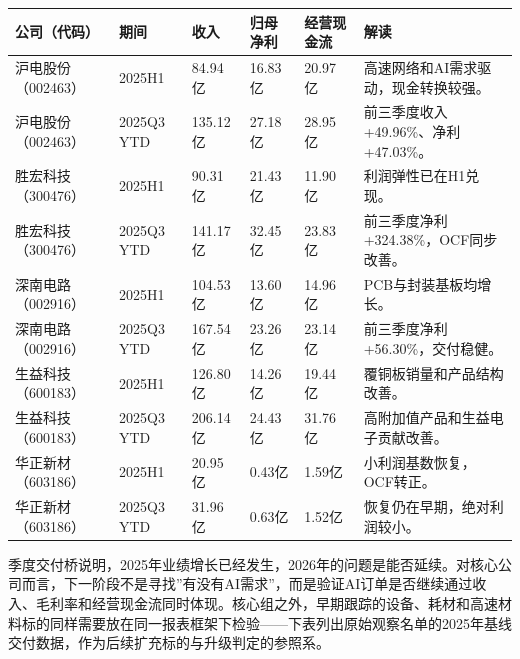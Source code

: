 \begin{exhibitbox}[图表6-4：官方季度交付桥]
\footnotesize
\begin{tabularx}{\textwidth}{L{1.8cm}L{1.8cm}R{1.7cm}R{1.7cm}R{1.7cm}X}
\toprule
\textbf{公司（代码）} & \textbf{期间} & \textbf{收入} & \textbf{归母净利} & \textbf{经营现金流} & \textbf{解读} \\
\midrule
沪电股份（002463） & 2025H1 & 84.94亿 & 16.83亿 & 20.97亿 & 高速网络和AI需求驱动，现金转换较强。 \\
沪电股份（002463） & 2025Q3 YTD & 135.12亿 & 27.18亿 & 28.95亿 & 前三季度收入+49.96\%、净利+47.03\%。 \\
胜宏科技（300476） & 2025H1 & 90.31亿 & 21.43亿 & 11.90亿 & 利润弹性已在H1兑现。 \\
胜宏科技（300476） & 2025Q3 YTD & 141.17亿 & 32.45亿 & 23.83亿 & 前三季度净利+324.38\%，OCF同步改善。 \\
深南电路（002916） & 2025H1 & 104.53亿 & 13.60亿 & 14.96亿 & PCB与封装基板均增长。 \\
深南电路（002916） & 2025Q3 YTD & 167.54亿 & 23.26亿 & 23.14亿 & 前三季度净利+56.30\%，交付稳健。 \\
生益科技（600183） & 2025H1 & 126.80亿 & 14.26亿 & 19.44亿 & 覆铜板销量和产品结构改善。 \\
生益科技（600183） & 2025Q3 YTD & 206.14亿 & 24.43亿 & 31.76亿 & 高附加值产品和生益电子贡献改善。 \\
华正新材（603186） & 2025H1 & 20.95亿 & 0.43亿 & 1.59亿 & 小利润基数恢复，OCF转正。 \\
华正新材（603186） & 2025Q3 YTD & 31.96亿 & 0.63亿 & 1.52亿 & 恢复仍在早期，绝对利润较小。 \\
\bottomrule
\end{tabularx}
\end{exhibitbox}

季度交付桥说明，2025年业绩增长已经发生，2026年的问题是能否延续。对核心公司而言，下一阶段不是寻找”有没有AI需求”，而是验证AI订单是否继续通过收入、毛利率和经营现金流同时体现。核心组之外，早期跟踪的设备、耗材和高速材料标的同样需要放在同一报表框架下检验——下表列出原始观察名单的2025年基线交付数据，作为后续扩充标的与升级判定的参照系。

